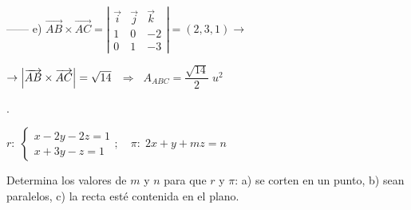 \begin{proofw}
\noindent ------ e) $\overrightarrow{AB} \times \overrightarrow{AC}=
\left| \begin{matrix} \vec i&\vec j&\vec k \\ 1&0&-2\\0&1&-3 \end{matrix} \right|=(2,3,1) \to $

\noindent $\to \abs{\overrightarrow{AB} \times \overrightarrow{AC}}=\sqrt{14}$
$ \;\Rightarrow \;\; A_{ABC}=\dfrac {\sqrt{14}}2\; u^2$
\end{proofw}


\begin{ejre}.

	$r:\;\begin{cases} x-2y-2z=1\\x+3y-z=1\end{cases};\quad \pi:\; 2x+y+mz=n$
	
\noindent Determina los valores de $m$ y $n$ para que $r$ y $\pi$:
	a) se corten en un punto, b) sean paralelos, c) la recta esté contenida en el plano.
\end{ejre}

